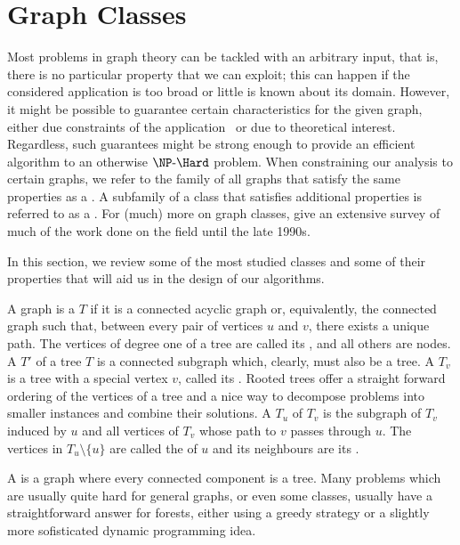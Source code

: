 \section{Graph Classes}
\label{sec:graph_classes}

Most problems in graph theory can be tackled with an arbitrary input, that is, there is no particular property that we can exploit; this can happen if the considered application is too broad or little is known about its domain.
However, it might be possible to guarantee certain characteristics for the given graph, either due constraints of the application~\citep{fernando_chordal} or due to theoretical interest.
Regardless, such guarantees might be strong enough to provide an efficient algorithm to an otherwise $\NPH$ problem.
When constraining our analysis to certain graphs, we refer to the family of all graphs that satisfy the same properties as a .
A subfamily of a class that satisfies additional properties is referred to as a .
For (much) more on graph classes, \cite{classes_survey} give an extensive survey of much of the work done on the field until the late 1990s.

In this section, we review some of the most studied classes and some of their properties that will aid us in the design of our algorithms.

A graph is a  $T$ if it is a connected acyclic graph or, equivalently, the connected graph such that, between every pair of vertices $u$ and $v$, there exists a unique path.
The vertices of degree one of a tree are called its , and all others are  nodes. A  $T'$ of a tree $T$ is a connected subgraph which, clearly, must also be a tree.
A  $T_v$ is a tree with a special vertex $v$, called its .
Rooted trees offer a straight forward ordering of the vertices of a tree and a nice way to decompose problems into smaller instances and combine their solutions.
A  $T_u$ of $T_v$ is the subgraph of $T_v$ induced by $u$ and all vertices of $T_v$ whose path to $v$ passes through $u$.
The vertices in $T_u \setminus \{u\}$ are called the  of $u$ and its neighbours are its .

A  is a graph where every connected component is a tree.
Many problems which are usually quite hard for general graphs, or even some classes, usually have a straightforward answer for forests, either using a greedy strategy or a slightly more sofisticated dynamic programming idea.


